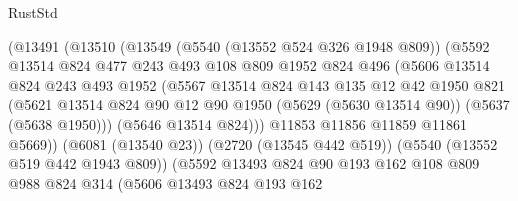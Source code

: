 \begin{lexlean}{RustStd}
\begin{coremodule}
                        (@13491
                          (@13510
                            (@13549
                              (@5540 (@13552 @524 @326 @1948 @809))
                              (@5592
                                @13514
                                @824
                                @477
                                @243
                                @493
                                @108
                                @809
                                @1952
                                @824
                                @496
                                (@5606
                                  @13514
                                  @824
                                  @243
                                  @493
                                  @1952
                                  (@5567
                                    @13514
                                    @824
                                    @143
                                    @135
                                    @12
                                    @42
                                    @1950
                                    @821
                                    (@5621
                                      @13514
                                      @824
                                      @90
                                      @12
                                      @90
                                      @1950
                                      (@5629 (@5630 @13514 @90))
                                      (@5637 (@5638 @1950)))
                                    (@5646 @13514 @824)))
                                @11853
                                @11856
                                @11859
                                @11861
                                @5669))
                            (@6081 (@13540 @23))
                            (@2720 (@13545 @442 @519))
                            (@5540 (@13552 @519 @442 @1943 @809))
                            (@5592
                              @13493
                              @824
                              @90
                              @193
                              @162
                              @108
                              @809
                              @988
                              @824
                              @314
                              (@5606
                                @13493
                                @824
                                @193
                                @162

\end{coremodule}
\end{lexlean}
